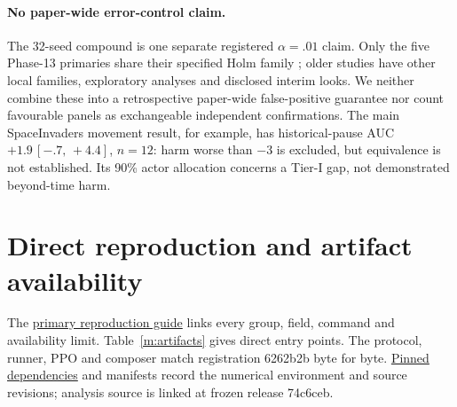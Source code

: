 \documentclass[10pt]{article}
\newcommand{\ci}[2]{\,[#1,\,#2]}
\newcommand{\artifact}[2]{\href{https://github.com/Nityahapani/rlearlydamage/blob/main/#1}{#2}}
\begin{document}
\paragraph{No paper-wide error-control claim.}
The 32-seed compound is one separate registered $\alpha=.01$ claim. Only the five Phase-13 primaries share their specified Holm family \citep{holm1979simple}; older studies have other local families, exploratory analyses and disclosed interim looks. We neither combine these into a retrospective paper-wide false-positive guarantee nor count favourable panels as exchangeable independent confirmations. The main SpaceInvaders movement result, for example, has historical-pause AUC $+1.9\ci{-.7}{+4.4}$, $n=12$: harm worse than $-3$ is excluded, but equivalence is not established. Its 90\% actor allocation concerns a Tier-I gap, not demonstrated beyond-time harm.

\section{Direct reproduction and artifact availability}\label{m:reproduction}
The \artifact{docs/primary_asterix_reproduction.md}{primary reproduction guide} links every group, field, command and availability limit. Table~\ref{m:artifacts} gives direct entry points. The protocol, runner, PPO and composer match registration 6262b2b byte for byte. \artifact{requirements-repro.txt}{Pinned dependencies} and manifests record the numerical environment and source revisions; analysis source is linked at frozen release 74c6ceb.
\end{document}
